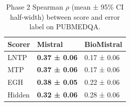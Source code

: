 \begin{table}
\caption{Phase 2 Spearman $\rho$ (mean ± 95\% CI half-width) between score and error label on PUBMEDQA.}
\label{tab:phase2_spearman_pubmedqa}
\begin{tabular}{lll}
\toprule
Scorer & Mistral & BioMistral \\
\midrule
LNTP & \textbf{0.37 ± 0.06} & 0.17 ± 0.06 \\
MTP & \textbf{0.37 ± 0.06} & 0.17 ± 0.06 \\
EGH & \textbf{0.38 ± 0.05} & 0.22 ± 0.06 \\
Hidden & \textbf{0.32 ± 0.06} & 0.28 ± 0.06 \\
\bottomrule
\end{tabular}
\end{table}
